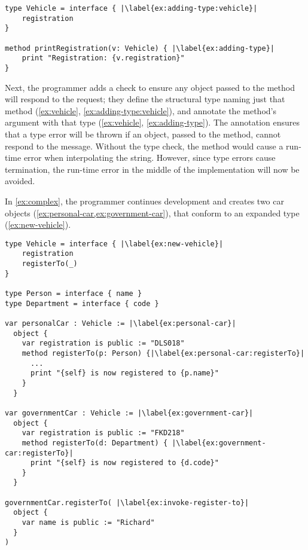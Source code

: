 \begin{lstlisting}[label={ex:vehicle},caption={Adding a type annotation to a method parameter.},escapechar=|,columns=flexible,float,floatplacement=H]
type Vehicle = interface { |\label{ex:adding-type:vehicle}|
    registration    
}

method printRegistration(v: Vehicle) { |\label{ex:adding-type}|
    print "Registration: {v.registration}"
}
\end{lstlisting}

Next, the programmer adds a check to ensure any object passed to the
 method will respond to the
 request; 
they define the structural type \citep{theCleanVehicle}
naming just that method (\cref{ex:vehicle}, \cref{ex:adding-type:vehicle}), 
and annotate the  method's
argument with that type (\cref{ex:vehicle}, \cref{ex:adding-type}).
The annotation ensures that a type error will be thrown if an object,
passed to the  method,
cannot respond to the  message.
Without the type check, the  method would
cause a run-time error when interpolating the string.
However, since type errors cause termination, 
the run-time error in the middle of the
 implementation
will now be avoided.

In \cref{ex:complex}, 
the programmer continues development and creates two car objects 
(\cref{ex:personal-car,ex:government-car}),
that conform to an expanded  type (\cref{ex:new-vehicle}).


\begin{lstlisting}[caption={A program in development with inconsistently
    typed \code{registerTo} methods.},escapechar=|,label={ex:complex},float,floatplacement=htb,columns=flexible,float,floatplacement=H]
type Vehicle = interface { |\label{ex:new-vehicle}|
    registration
    registerTo(_)
}

type Person = interface { name }
type Department = interface { code }

var personalCar : Vehicle := |\label{ex:personal-car}|
  object {
    var registration is public := "DLS018"
    method registerTo(p: Person) {|\label{ex:personal-car:registerTo}|
      ...
      print "{self} is now registered to {p.name}"
    } 
  }

var governmentCar : Vehicle := |\label{ex:government-car}|
  object {
    var registration is public := "FKD218"
    method registerTo(d: Department) { |\label{ex:government-car:registerTo}|
      print "{self} is now registered to {d.code}"
    }
  }

governmentCar.registerTo( |\label{ex:invoke-register-to}|
  object {
    var name is public := "Richard"
  }
)
\end{lstlisting}


